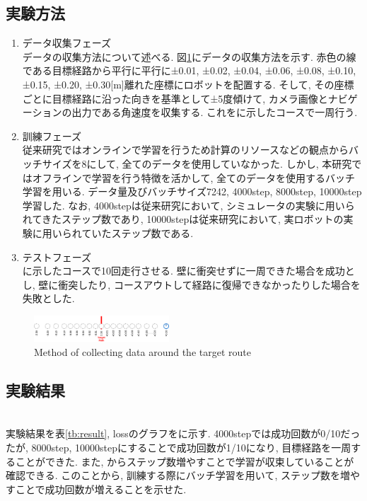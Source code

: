 \documentclass[10pt]{ujarticle}
\begin{document}
    \subsection{実験方法}
    \begin{enumerate}
        \item{データ収集フェーズ}\mbox{}\\データの収集方法について述べる. 図\ref{Fig:collect-data}にデータの収集方法を示す. 赤色の線である目標経路から平行に平行に±0.01, ±0.02, ±0.04, ±0.06, ±0.08, ±0.10, ±0.15, ±0.20, ±0.30[m]離れた座標にロボットを配置する. そして, その座標ごとに目標経路に沿った向きを基準として±5度傾けて, カメラ画像とナビゲーションの出力である角速度を収集する. これをに示したコースで一周行う. 
        \item{訓練フェーズ}\mbox{}\\従来研究ではオンラインで学習を行うため計算のリソースなどの観点からバッチサイズを8にして, 全てのデータを使用していなかった. しかし, 本研究ではオフラインで学習を行う特徴を活かして, 全てのデータを使用するバッチ学習を用いる. データ量及びバッチサイズ7242, 4000step, 8000step, 10000step学習した. なお, 4000stepは従来研究において, シミュレータの実験に用いられてきたステップ数であり, 10000stepは従来研究において, 実ロボットの実験に用いられていたステップ数である. 
        \item{テストフェーズ}\mbox{}\\に示したコースで10回走行させる. 壁に衝突せずに一周できた場合を成功とし, 壁に衝突したり, コースアウトして経路に復帰できなかったりした場合を失敗とした. 
    \end{enumerate}

    \begin{figure}[h]
        \centering
        \includegraphics[width=0.45\textwidth]{fig/collect-data.png}
        \caption{Method of collecting data around the target route}
        \label{Fig:collect-data}
    \end{figure}

    \subsection{実験結果}\mbox{}\\
    実験結果を表\ref{tb:result}, lossのグラフをに示す. 4000stepでは成功回数が0/10だったが, 8000step, 10000stepにすることで成功回数が1/10になり, 目標経路を一周することができた. また, からステップ数増やすことで学習が収束していることが確認できる. このことから, 訓練する際にバッチ学習を用いて, ステップ数を増やすことで成功回数が増えることを示せた. 
\end{document}
